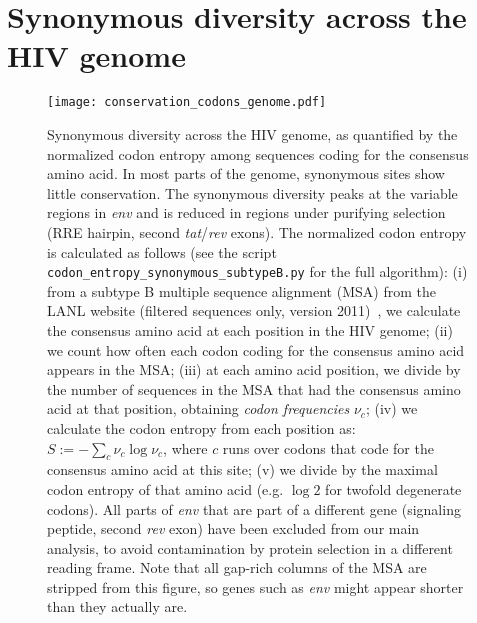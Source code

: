\section{Synonymous diversity across the HIV genome}
\begin{figure}[!ht]
\begin{center}
\texttt{[image: conservation\_codons\_genome.pdf]}
\caption{
Synonymous diversity across the HIV genome, as quantified by the normalized
codon entropy among sequences coding for the consensus amino acid. In most
parts of the genome, synonymous sites show little conservation. The synonymous
diversity peaks at the variable regions in {\it env} and is reduced in regions 
under purifying selection (RRE hairpin, second {\it tat}/{\it rev} exons). The
normalized codon entropy is calculated as follows (see the script
\texttt{codon\_entropy\_synonymous\_subtypeB.py} for the full algorithm): (i)
from a subtype B multiple sequence alignment (MSA) from the LANL website (filtered sequences only, version 2011)~\cite{LANL2012}, we calculate the
consensus amino acid at each position in the HIV genome; (ii) we count how often
each codon coding for the consensus amino acid appears in the MSA; (iii) at each
amino acid position, we divide by the number of sequences in the MSA that had
the consensus amino acid at that position, obtaining {\it codon frequencies}
$\nu_c$; (iv) we calculate the codon entropy from each position as: $S := -
\sum_{c} \nu_c \log \nu_c$, where $c$ runs over codons that code for the
consensus amino acid at this site; (v) we divide by the maximal codon entropy of
that amino acid (e.g. $\log 2$ for twofold degenerate codons). All parts of
{\it env} that are part of a different gene (signaling peptide, second {\it rev}
exon) have been excluded from our main analysis, to avoid contamination by
protein selection in a different reading frame.
Note that all gap-rich columns of the MSA are stripped from this figure, so genes such as {\it env} might appear shorter than they actually
are.
}
\label{fig:syndiv_genome}
\end{center}
\end{figure}
\newpage
% 

